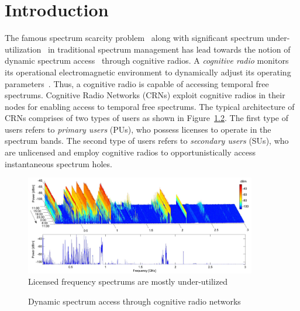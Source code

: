 \chapter{Introduction}\label{intro}
The famous spectrum scarcity problem~\cite{SpectrumScarcity} along with significant spectrum under-utilization~\cite{valenta2010survey} in traditional spectrum management has lead towards the notion of dynamic spectrum access~\cite{akyildiz2006next} through cognitive radios. A \textit{cognitive radio} monitors its operational electromagnetic environment to dynamically adjust its operating parameters~\cite{Mitola}. Thus, a cognitive radio is capable of accessing temporal free spectrums. Cognitive Radio Networks (CRNs) exploit cognitive radios in their nodes for enabling access to temporal free spectrums. The typical architecture of CRNs comprises of two types of users as shown in Figure~\ref{fig:crn}. The first type of users refers to \textit{primary users} (PUs), who possess licenses to operate in the spectrum bands. The second type of users refers to \textit{secondary users} (SUs), who are unlicensed and employ cognitive radios to opportunistically access instantaneous spectrum holes.


\begin{figure}[!htbp]
    \begin{center}
        \includegraphics[width=0.9\textwidth]{myFigures/SpectrumUnderutilizationSir.PNG}
        \caption{Licensed frequency spectrums are mostly under-utilized~\cite{valenta2010survey}}
        \label{fig:SpectrumUnderutilization}
    \end{center}
\end{figure}

\begin{figure}[!htbp]
    \begin{center}
        
        \caption{Dynamic spectrum access through cognitive radio networks}
        \label{fig:crn}
    \end{center}
\end{figure}

